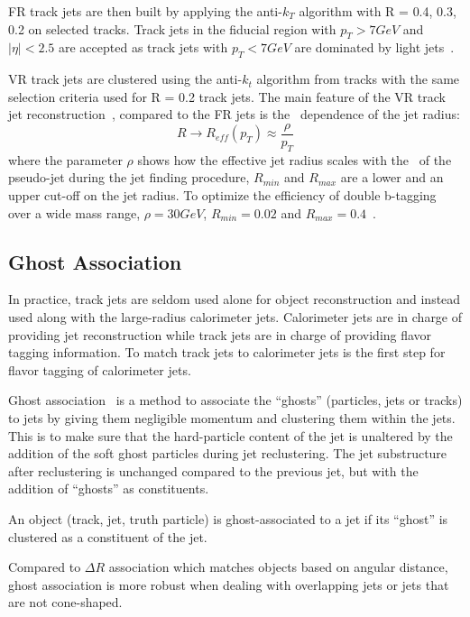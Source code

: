 \par FR track jets are then built by applying the anti-$k_T$ algorithm with R = {0.4, 0.3, 0.2} on selected tracks. Track jets in the fiducial region with $p_T > 7 GeV$ and $|\eta| < 2.5$ are accepted as track jets with $p_T < 7 GeV$ are dominated by light jets~\cite{ATL-PHYS-PUB-2014-013}. 				
\par VR track jets are clustered using the anti-$k_t$ algorithm from tracks with the same selection criteria used for R = 0.2 track jets. The main feature of the VR track jet reconstruction~\cite{Krohn:2009zg}, compared to the FR jets is the \pt~dependence of the jet radius:
\begin{equation}
R \rightarrow R_{eff}(p_T) \approx \frac{\rho}{p_T}
\end{equation}
where the parameter $\rho$ shows how the effective jet radius scales with the \pt~of the pseudo-jet during the jet finding procedure, $R_{min}$ and $R_{max}$ are a lower and an upper cut-off on the jet radius.
To optimize the efficiency of double b-tagging over a wide mass range, $\rho = 30 GeV$, $R_{min} = 0.02$ and $R_{max} = 0.4$~\cite{ATL-PHYS-PUB-2017-010}.

\subsection{Ghost Association}
\label{sec:ga}

\par In practice, track jets are seldom used alone for object reconstruction and instead used along with the large-radius calorimeter jets. Calorimeter jets are in charge of providing jet reconstruction while track jets are in charge of providing flavor tagging information. To match track jets to calorimeter jets is the first step for flavor tagging of calorimeter jets. 
\par Ghost association~\cite{Cacciari:2007fd,Cacciari:2008gn} is a method to associate the ``ghosts'' (particles, jets or tracks) to jets by giving them negligible momentum and clustering them within the jets. This is to make sure that the hard-particle content of the jet is unaltered by the addition of the soft ghost particles during jet reclustering. The jet substructure after reclustering is unchanged compared to the previous jet, but with the addition of ``ghosts'' as constituents.
\par An object (track, jet, truth particle) is ghost-associated to a jet if its ``ghost'' is clustered as a constituent of the jet.
\par Compared to $\Delta R$ association which matches objects based on angular distance, ghost association is more robust when dealing with overlapping jets or jets that are not cone-shaped.

